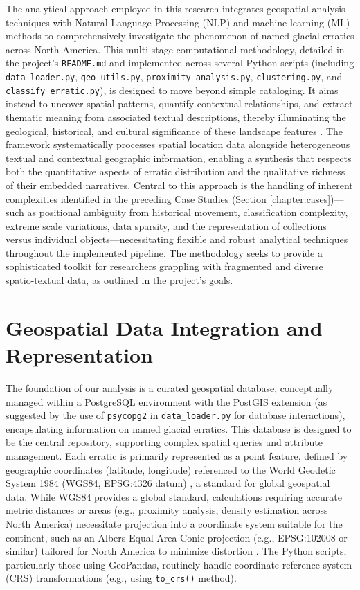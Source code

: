 \documentclass[
11pt, %
english, %
singlespacing, %
headsepline, %
]{MastersDoctoralThesis} %
\begin{document}
The analytical approach employed in this research integrates geospatial analysis techniques with Natural Language Processing (NLP) and machine learning (ML) methods to comprehensively investigate the phenomenon of named glacial erratics across North America. This multi-stage computational methodology, detailed in the project's \texttt{README.md} and implemented across several Python scripts (including \texttt{data\_loader.py}, \texttt{geo\_utils.py}, \texttt{proximity\_analysis.py}, \texttt{clustering.py}, and \texttt{classify\_erratic.py}), is designed to move beyond simple cataloging. It aims instead to uncover spatial patterns, quantify contextual relationships, and extract thematic meaning from associated textual descriptions, thereby illuminating the geological, historical, and cultural significance of these landscape features \cite{Gregory2013, Bodenhamer2010}. The framework systematically processes spatial location data alongside heterogeneous textual and contextual geographic information, enabling a synthesis that respects both the quantitative aspects of erratic distribution and the qualitative richness of their embedded narratives. Central to this approach is the handling of inherent complexities identified in the preceding Case Studies (Section \ref{chapter:cases})—such as positional ambiguity from historical movement, classification complexity, extreme scale variations, data sparsity, and the representation of collections versus individual objects—necessitating flexible and robust analytical techniques throughout the implemented pipeline. The methodology seeks to provide a sophisticated toolkit for researchers grappling with fragmented and diverse spatio-textual data, as outlined in the project's goals.

\section{Geospatial Data Integration and Representation}
\label{sec:geospatial_data}

The foundation of our analysis is a curated geospatial database, conceptually managed within a PostgreSQL environment with the PostGIS extension (as suggested by the use of \texttt{psycopg2} in \texttt{data\_loader.py} for database interactions), encapsulating information on named glacial erratics. This database is designed to be the central repository, supporting complex spatial queries and attribute management. Each erratic is primarily represented as a point feature, defined by geographic coordinates (latitude, longitude) referenced to the World Geodetic System 1984 (WGS84, EPSG:4326 datum) \cite{HofmannWellenhof2006}, a standard for global geospatial data. While WGS84 provides a global standard, calculations requiring accurate metric distances or areas (e.g., proximity analysis, density estimation across North America) necessitate projection into a coordinate system suitable for the continent, such as an Albers Equal Area Conic projection (e.g., EPSG:102008 or similar) tailored for North America to minimize distortion \cite{Snyder1987}. The Python scripts, particularly those using GeoPandas, routinely handle coordinate reference system (CRS) transformations (e.g., using \texttt{to\_crs()} method).
\end{document}
